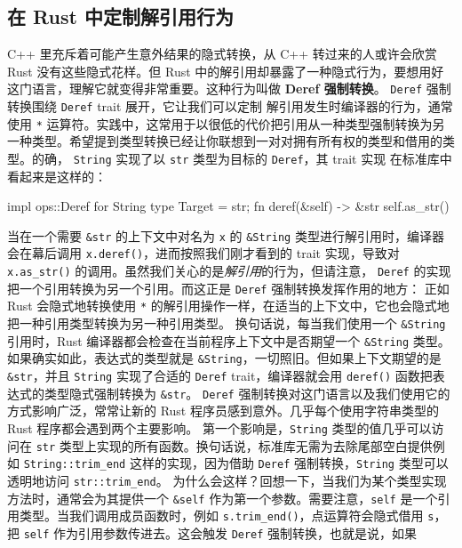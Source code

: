 \subsection{在 Rust 中定制解引用行为}
\label{idx:idx_554c98b0}
\label{idx:idx_2a19e197}
C++ 里充斥着可能产生意外结果的隐式转换，从 C++ 转过来的人或许会欣赏 Rust 没有这些隐式花样。但 Rust 中的解引用却暴露了一种隐式行为，要想用好这门语言，理解它就变得非常重要。这种行为叫做 \textbf{Deref 强制转换}。
\texttt{Deref} 强制转换围绕 \texttt{Deref} trait 展开，它让我们可以定制
解引用发生时编译器的行为，通常使用 \texttt{*} 运算符。实践中，这常用于以很低的代价把引用从一种类型强制转换为另一种类型。希望提到类型转换已经让你联想到一对对拥有所有权的类型和借用的类型。的确，
\texttt{String} 实现了以 \texttt{str} 类型为目标的 \texttt{Deref}，其 trait 实现
在标准库中看起来是这样的：
\begin{codebox}[rust]
impl ops::Deref for String {
    type Target = str;
    fn deref(&self) -> &str {
        self.as_str()
    }
}
\end{codebox}
当在一个需要 \texttt{\&str} 的上下文中对名为 \texttt{x} 的 \texttt{\&String} 类型进行解引用时，编译器会在幕后调用 \texttt{x.deref()}，进而按照我们刚才看到的 trait 实现，导致对 \texttt{x.as\_str()} 的调用。虽然我们关心的是\emph{解引用}的行为，但请注意，
\texttt{Deref} 的实现把一个引用转换为另一个引用。而这正是 \texttt{Deref} 强制转换发挥作用的地方：
正如 Rust 会隐式地转换使用 \texttt{*} 的解引用操作一样，在适当的上下文中，它也会隐式地把一种引用类型转换为另一种引用类型。
\label{idx:idx_098f87d0}
换句话说，每当我们使用一个 \texttt{\&String} 引用时，Rust 编译器都会检查在当前程序上下文中是否期望一个 \texttt{\&String} 类型。如果确实如此，表达式的类型就是 \texttt{\&String}，一切照旧。但如果上下文期望的是 \texttt{\&str}，并且 \texttt{String} 实现了合适的 \texttt{Deref} trait，编译器就会用 \texttt{deref()} 函数把表达式的类型隐式强制转换为 \texttt{\&str}。
\texttt{Deref} 强制转换对这门语言以及我们使用它的方式影响广泛，常常让新的 Rust 程序员感到意外。几乎每个使用字符串类型的 Rust 程序都会遇到两个主要影响。
第一个影响是，\texttt{String} 类型的值几乎可以访问在 \texttt{str} 类型上实现的所有函数。换句话说，标准库无需为去除尾部空白提供例如 \texttt{String::\allowbreak{}trim\_\allowbreak{}end} 这样的实现，因为借助 \texttt{Deref} 强制转换，\texttt{String} 类型可以透明地访问 \texttt{str::\allowbreak{}trim\_\allowbreak{}end}。
为什么会这样？回想一下，当我们为某个类型实现方法时，通常会为其提供一个 \texttt{\&self} 作为第一个参数。需要注意，\texttt{self} 是一个引用类型。当我们调用成员函数时，例如 \texttt{s.\allowbreak{}trim\_\allowbreak{}end(\allowbreak{})\allowbreak{}}，点运算符会隐式借用 \texttt{s}，把 \texttt{self} 作为引用参数传进去。这会触发 \texttt{Deref} 强制转换，也就是说，如果

